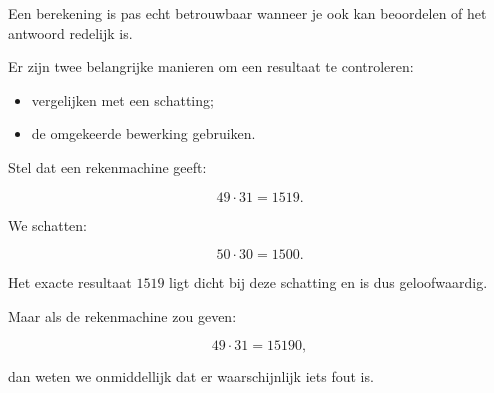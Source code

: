 \documentclass{ximera}
\begin{document}


Een berekening is pas echt betrouwbaar wanneer je ook kan beoordelen of het
antwoord redelijk is.

Er zijn twee belangrijke manieren om een resultaat te controleren:

\begin{itemize}
    \item vergelijken met een schatting;
    \item de omgekeerde bewerking gebruiken.
\end{itemize}




Stel dat een rekenmachine geeft:

\[
49\cdot31=1519.
\]

We schatten:

\[
50\cdot30=1500.
\]

Het exacte resultaat \(1519\) ligt dicht bij deze schatting en is dus
geloofwaardig.

Maar als de rekenmachine zou geven:

\[
49\cdot31=15190,
\]

dan weten we onmiddellijk dat er waarschijnlijk iets fout is.
\end{document}
